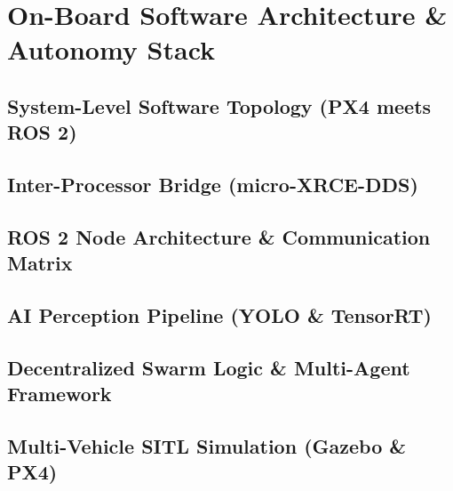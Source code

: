 \chapter{On-Board Software Architecture \& Autonomy Stack}
\label{ch:software_autonomy}

\section{System-Level Software Topology (PX4 meets ROS 2)}
\label{sec:software_topology}

\section{Inter-Processor Bridge (micro-XRCE-DDS)}
\label{sec:xrce_dds_bridge}

\section{ROS 2 Node Architecture \& Communication Matrix}
\label{sec:ros2_node_architecture}

\section{AI Perception Pipeline (YOLO \& TensorRT)}
\label{sec:ai_perception_pipeline}

\section{Decentralized Swarm Logic \& Multi-Agent Framework}
\label{sec:swarm_logic}

\section{Multi-Vehicle SITL Simulation (Gazebo \& PX4)}
\label{sec:gazebo_multi_vehicle_sim}
